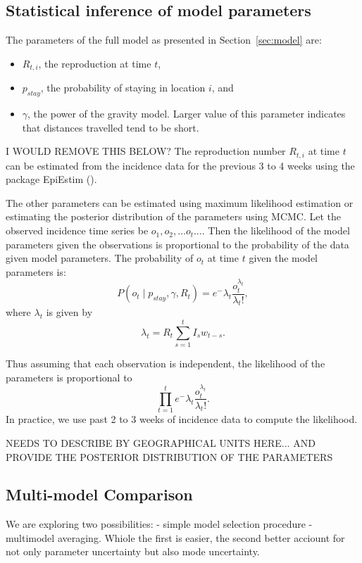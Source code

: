 \documentclass[11pt,]{article}
\begin{document}
\subsection{Statistical inference of model parameters}
The parameters of the full model as presented in Section~\ref{sec:model} are: 
\begin{itemize}
\item $R_{t, i}$, the reproduction at time $t$,
\item $p_{stay}$, the probability of staying in location $i$, and 
\item $\gamma$, the power of the gravity model. Larger value of this parameter indicates 
that distances travelled tend to be short. 
\end{itemize}

I WOULD REMOVE THIS BELOW?
The reproduction number $R_{t, i}$ at time $t$ can be estimated from the
incidence data for the previous 3 to 4 weeks using the package EpiEstim
(\cite{cori2013new}). 

The other parameters can be estimated using maximum likelihood
estimation or estimating the posterior distribution of the parameters using
MCMC. Let the observed incidence time series be $o_1, o_2, \dots
o_t \dots $. Then the likelihood of the model parameters given the
observations is proportional to the probability of the data given
model parameters.  The probability of $o_t$ at time $t$ given
the model parameters is:
\[ P(o_t \mid p_{stay}, \gamma, R_t) = e^-{\lambda_t}
  \frac{o_t^{\lambda_t}}{\lambda_t !}, \]
where $\lambda_t$ is given by
\[\lambda_t = R_t \sum_{s = 1}^t{I_{s}w_{t - s}}.\]

Thus assuming that each observation is independent, the likelihood of the parameters is proportional to
\[
\prod_{t = 1}^{t}{e^-{\lambda_t} \frac{o_t^{\lambda_t}}{\lambda_t !}}.
\]
In practice, we use past 2 to 3 weeks of incidence data to compute the
likelihood.

NEEDS TO DESCRIBE BY GEOGRAPHICAL UNITS HERE... AND PROVIDE THE POSTERIOR DISTRIBUTION OF THE PARAMETERS

\subsection{Multi-model Comparison}

We are exploring two possibilities: 
- simple model selection procedure
- multimodel averaging.
Whiole the first is easier, the second better acciount for not only parameter uncertainty but also mode uncertainty.
\end{document}
